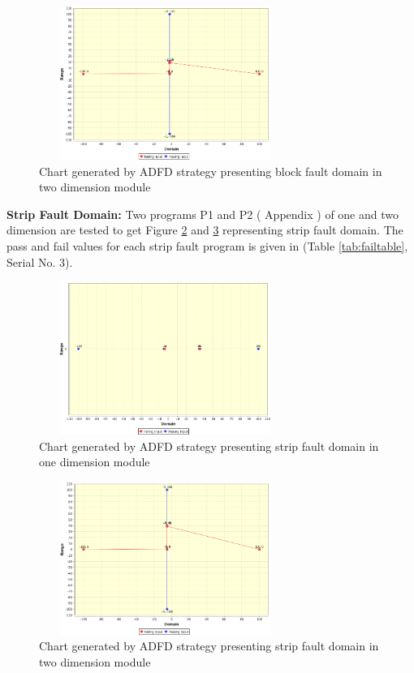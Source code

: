 \documentclass{acm_proc_article-sp}
\begin{document}
\begin{figure}[H]
\centering
\includegraphics[width=8.2cm,height=5cm]{BFDTwo.png}
\caption{Chart generated by ADFD strategy presenting block fault domain in two dimension module}
\label{fig:BFDTwo}
\end{figure}



\textbf{Strip Fault Domain:} Two programs P1 and P2 ( Appendix ) of one and two dimension are tested to get Figure \ref{fig:SFDOne} and \ref{fig:SFDTwo} representing strip fault domain. The pass and fail values for each strip fault program is given in (Table \ref{tab:failtable}, Serial No. 3).



\begin{figure}[H]
\centering
\includegraphics[width=8.2cm,height=5cm]{SFDOne.png}
\caption{Chart generated by ADFD strategy presenting strip fault domain in one dimension module}
\label{fig:SFDOne}
\end{figure}

\begin{figure}[H]
\centering
\includegraphics[width=8.2cm,height=5cm]{SFDTwo.png}
\caption{Chart generated by ADFD strategy presenting strip fault domain in two dimension module}
\label{fig:SFDTwo}
\end{figure}
\end{document}
